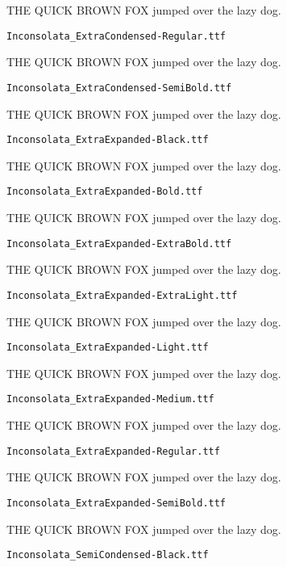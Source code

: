 \documentclass{article}
\begin{document}
THE QUICK BROWN FOX jumped over the lazy dog.

\setmainfont[Extension=.ttf]{Inconsolata_ExtraCondensed-Regular}
\noindent \verb!Inconsolata_ExtraCondensed-Regular.ttf!

THE QUICK BROWN FOX jumped over the lazy dog.

\setmainfont[Extension=.ttf]{Inconsolata_ExtraCondensed-SemiBold}
\noindent \verb!Inconsolata_ExtraCondensed-SemiBold.ttf!

THE QUICK BROWN FOX jumped over the lazy dog.

\setmainfont[Extension=.ttf]{Inconsolata_ExtraExpanded-Black}
\noindent \verb!Inconsolata_ExtraExpanded-Black.ttf!

THE QUICK BROWN FOX jumped over the lazy dog.

\setmainfont[Extension=.ttf]{Inconsolata_ExtraExpanded-Bold}
\noindent \verb!Inconsolata_ExtraExpanded-Bold.ttf!

THE QUICK BROWN FOX jumped over the lazy dog.

\setmainfont[Extension=.ttf]{Inconsolata_ExtraExpanded-ExtraBold}
\noindent \verb!Inconsolata_ExtraExpanded-ExtraBold.ttf!

THE QUICK BROWN FOX jumped over the lazy dog.

\setmainfont[Extension=.ttf]{Inconsolata_ExtraExpanded-ExtraLight}
\noindent \verb!Inconsolata_ExtraExpanded-ExtraLight.ttf!

THE QUICK BROWN FOX jumped over the lazy dog.

\setmainfont[Extension=.ttf]{Inconsolata_ExtraExpanded-Light}
\noindent \verb!Inconsolata_ExtraExpanded-Light.ttf!

THE QUICK BROWN FOX jumped over the lazy dog.

\setmainfont[Extension=.ttf]{Inconsolata_ExtraExpanded-Medium}
\noindent \verb!Inconsolata_ExtraExpanded-Medium.ttf!

THE QUICK BROWN FOX jumped over the lazy dog.

\setmainfont[Extension=.ttf]{Inconsolata_ExtraExpanded-Regular}
\noindent \verb!Inconsolata_ExtraExpanded-Regular.ttf!

THE QUICK BROWN FOX jumped over the lazy dog.

\setmainfont[Extension=.ttf]{Inconsolata_ExtraExpanded-SemiBold}
\noindent \verb!Inconsolata_ExtraExpanded-SemiBold.ttf!

THE QUICK BROWN FOX jumped over the lazy dog.

\setmainfont[Extension=.ttf]{Inconsolata_SemiCondensed-Black}
\noindent \verb!Inconsolata_SemiCondensed-Black.ttf!
\end{document}
